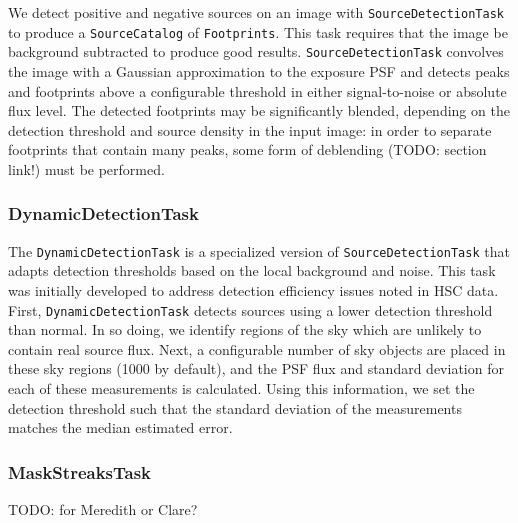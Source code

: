 We detect positive and negative sources on an image with \texttt{SourceDetectionTask} to produce a \texttt{SourceCatalog} of \texttt{Footprints}.
This task requires that the image be background subtracted to produce good results.
\texttt{SourceDetectionTask} convolves the image with a Gaussian approximation to the exposure PSF and detects peaks and footprints above a configurable threshold in either signal-to-noise or absolute flux level.
The detected footprints may be significantly blended, depending on the detection threshold and source density in the input image: in order to separate footprints that contain many peaks, some form of deblending (TODO: section link!) must be performed.

\subsubsection{DynamicDetectionTask}
\label{sec:DynamicDetectionTask}

The \texttt{DynamicDetectionTask} is a specialized version of \texttt{SourceDetectionTask} that adapts detection thresholds based on the local background and noise.
This task was initially developed to address detection efficiency issues noted in HSC data.
First, \texttt{DynamicDetectionTask} detects sources using a lower detection threshold than normal.
In so doing, we identify regions of the sky which are unlikely to contain real source flux.
Next, a configurable number of sky objects are placed in these sky regions (1000 by default), and the PSF flux and standard deviation for each of these measurements is calculated.
Using this information, we set the detection threshold such that the standard deviation of the measurements matches the median estimated error.

\subsubsection{MaskStreaksTask}
\label{MaskStreaksTask}

TODO: for Meredith or Clare?
